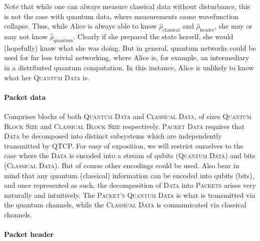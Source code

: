 Note that while one can always measure classical data without disturbance, this is not the case with quantum data, where measurements cause wavefunction collapse. Thus, while Alice is always able to know $\hat\rho_\mathrm{classical}$ and $\hat\rho_\mathrm{header}$, she may or may not know $\hat\rho_\mathrm{quantum}$. Clearly if she prepared the state herself, she would (hopefully) know what she was doing. But in general, quantum networks could be used for far less trivial networking, where Alice is, for example, an intermediary in a distributed quantum computation. In this instance, Alice is unlikely to know what her \textsc{Quantum Data} is.

%
%

\paragraph{Packet data} 

Comprises blocks of both \textsc{Quantum Data} and \textsc{Classical Data}, of sizes \textsc{Quantum Block Size} and \textsc{Classical Block Size} respectively. \textsc{Packet Data} requires that \textsc{Data} be decomposed into distinct subsystems which are independently transmitted by QTCP. For easy of exposition, we will restrict ourselves to the case where the \textsc{Data} is encoded into a stream of qubits (\textsc{Quantum Data}) and bits (\textsc{Classical Data}). But of course other encodings could be used. Also bear in mind that any quantum (classical) information can be encoded into qubits (bits), and once represented as such, the decomposition of \textsc{Data} into \textsc{Packets} arises very naturally and intuitively. The \textsc{Packet's} \textsc{Quantum Data} is what is transmitted via the quantum channels, while the \textsc{Classical Data} is communicated via classical channels.

%
%

\paragraph{Packet header} \label{sec:packet_header} 

